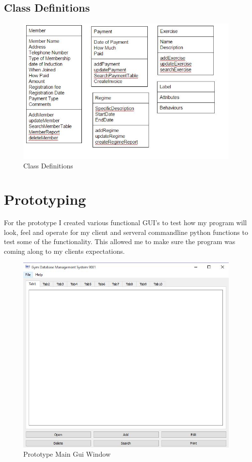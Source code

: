 \subsection{Class Definitions}

\begin{figure}[H]
    \includegraphics[width=\textwidth]{NewClassDefs.JPG}
    \caption{Class Definitions} \label{fig:Class Definitions}
\end{figure}

\section{Prototyping}

For the prototype I created various functional GUI's to test how my program will look, feel and operate for my client and serveral commandline python functions to test some of the functionality. This allowed me to make sure the program was coming along to my clients expectations.

\begin{figure}[H]
    \includegraphics[width=\textwidth]{PrototypeGui1.JPG}
    \caption{Prototype Main Gui Window} \label{fig:Prototype Main Gui Windows}
\end{figure}

